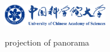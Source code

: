 \begin{figure}[!htbp]
    \centering
    \includegraphics[width=0.40\textwidth]{Img/ucas_logo.pdf}

    {projection of panorama}
    
    \label{fig:panorama-projection}
\end{figure}